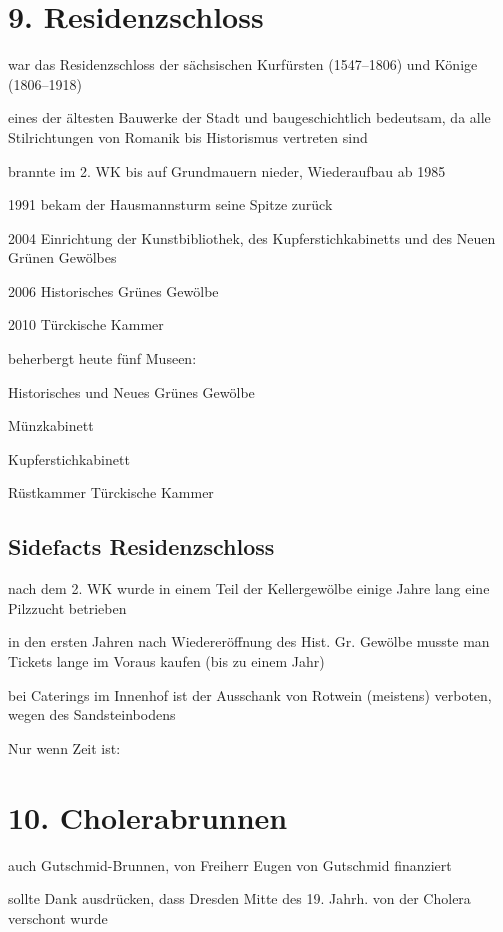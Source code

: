 \documentclass[a4paper,12pt]{report}
\begin{document}
\section{9. Residenzschloss}
\begin{itemize*}
\item war das Residenzschloss der sächsischen Kurfürsten (1547–1806) und Könige (1806–1918)
\item eines der ältesten Bauwerke der Stadt und baugeschichtlich bedeutsam, da alle Stilrichtungen von Romanik bis Historismus vertreten sind
\item brannte im 2. WK bis auf Grundmauern nieder, Wiederaufbau ab 1985
    \begin{itemize*}
    \item 1991 bekam der Hausmannsturm seine Spitze zurück
    \item 2004 Einrichtung der Kunstbibliothek, des Kupferstichkabinetts und des Neuen Grünen Gewölbes
    \item 2006 Historisches Grünes Gewölbe
    \item 2010 Türckische Kammer
    \end{itemize*}
\item beherbergt heute fünf Museen:
    \begin{itemize*}
    \item Historisches und Neues Grünes Gewölbe
    \item Münzkabinett
    \item Kupferstichkabinett
    \item Rüstkammer Türckische Kammer
    \end{itemize*}
\end{itemize*}
\subsection{Sidefacts Residenzschloss}
\begin{itemize*}
\item nach dem 2. WK wurde in einem Teil der Kellergewölbe einige Jahre lang eine Pilzzucht betrieben
\item in den ersten Jahren nach Wiedereröffnung des Hist. Gr. Gewölbe musste man Tickets lange im Voraus kaufen (bis zu einem Jahr)
\item bei Caterings im Innenhof ist der Ausschank von Rotwein (meistens) verboten, wegen des Sandsteinbodens
\end{itemize*}

Nur wenn Zeit ist:
\section{10. Cholerabrunnen}
\begin{itemize*}
\item auch Gutschmid-Brunnen, von Freiherr Eugen von Gutschmid finanziert
\item sollte Dank ausdrücken, dass Dresden Mitte des 19. Jahrh. von der Cholera verschont wurde
\end{itemize*}
\end{document}
